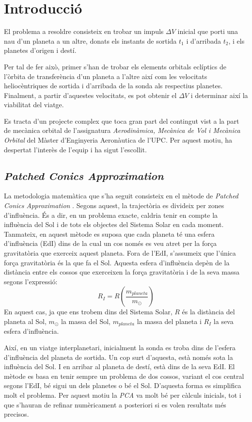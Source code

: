 \chapter{Introducció}

El problema a resoldre consisteix en trobar un impuls $\Delta V$ inicial que porti una nau d'un planeta a un altre, donats els instants de sortida $t_1$ i d'arribada $t_2$, i els planetes d'origen i destí.

Per tal de fer això, primer s'han de trobar els elements orbitals eclíptics de l'òrbita de transferència d'un planeta a l'altre així com les velocitats heliocèntriques de sortida i d'arribada de la sonda als respectius planetes. Finalment, a partir d'aquestes velocitats, es pot obtenir el $\Delta V$ i determinar així la viabilitat del viatge.

Es tracta d'un projecte complex que toca gran part del contingut vist a la part de mecànica orbital de l'assignatura \textit{Aerodinàmica, Mecànica de Vol i Mecànica Orbital} del Màster d'Enginyeria Aeronàutica de l'UPC. Per aquest motiu, ha despertat l'interès de l'equip i ha sigut l'escollit.

\section{\textit{Patched Conics Approximation}}
La metodologia matemàtica que s'ha seguit consisteix en el mètode de \textit{Patched Conics Approximation} \cite{Calaf2017d}. Segons aquest, la trajectòria es divideix per zones d'influència. És a dir, en un problema exacte, caldria tenir en compte la influència del Sol i de tots els objectes del Sistema Solar en cada moment. Tanmateix, en aquest mètode es suposa que cada planeta té una esfera d'influència (EdI) dins de la cual un cos només es veu atret per la força gravitatòria que exerceix aquest planeta. Fora de l'EdI, s'assumeix que l'única força gravitatòria és la que fa el Sol. Aquesta esfera d'influència depèn de la distància entre els cossos que exerceixen la força gravitatòria i de la seva massa segons l'expressió:
\begin{equation}
R_{I}=R\left(\frac{m_{planeta}}{m_\odot}\right)
\end{equation}
En aquest cas, ja que ens trobem dins del Sistema Solar, $R$ és la distància del planeta al Sol, $m_\odot$ la massa del Sol, $m_{planeta}$ la massa del planeta i $R_{I}$ la seva esfera d'influència.

Així, en un viatge interplanetari, inicialment la sonda es troba dins de l'esfera d'influència del planeta de sortida. Un cop surt d'aquesta, està només sota la influència del Sol. I en arribar al planeta de destí, està dins de la seva EdI. El mètode es basa en tenir sempre un problema de dos cossos, variant el cos central segons l'EdI, bé sigui un dels planetes o bé el Sol. D'aquesta forma es simplifica molt el problema. Per aquest motiu la \textit{PCA} va molt bé per càlculs inicials, tot i que s'hauran de refinar numèricament a posteriori si es volen resultats més precisos.

